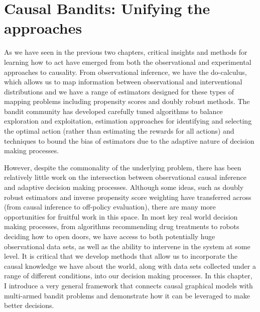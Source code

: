 \documentclass[11pt,a4paper,twoside]{report}
\theoremstyle{plain}
\theoremstyle{definition}
\begin{document}
\chapter{Causal Bandits: Unifying the approaches}
\label{chap:causal-bandit}

As we have seen in the previous two chapters, critical insights and methods for learning how to act have emerged from both the observational and experimental approaches to causality. From observational inference, we have the do-calculus, which allows us to map information between observational and interventional distributions and we have a range of estimators designed for these types of mapping problems including propensity scores and doubly robust methods. The bandit community has developed carefully tuned algorithms to balance exploration and exploitation, estimation approaches for identifying and selecting the optimal action (rather than estimating the rewards for all actions) and techniques to bound the bias of estimators due to the adaptive nature of decision making processes.

However, despite the commonality of the underlying problem, there has been relatively little work on the intersection between observational causal inference and adaptive decision making processes. Although some ideas, such as doubly robust estimators and inverse propensity score weighting have transferred across (from causal inference to off-policy evaluation), there are many more opportunities for fruitful work in this space. In most key real world decision making processes, from algorithms recommending drug treatments to robots deciding how to open doors, we have access to both potentially huge observational data sets, as well as the ability to intervene in the system at some level. It is critical that we develop methods that allow us to incorporate the causal knowledge we have about the world, along with data sets collected under a range of different conditions, into our decision making processes. In this chapter, I introduce a very general framework that connects causal graphical models with multi-armed bandit problems and demonstrate how it can be leveraged to make better decisions.
\end{document}
